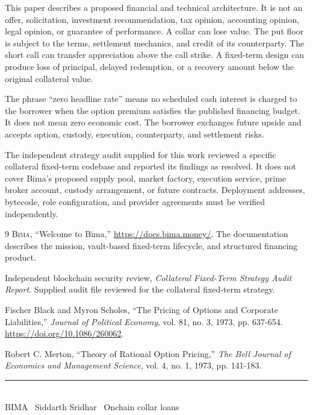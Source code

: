\documentclass[11pt,oneside]{article}
\newcommand{\Bima}{\textsc{Bima}}
\begin{document}
This paper describes a proposed financial and technical architecture. It is not an offer, solicitation, investment recommendation, tax opinion, accounting opinion, legal opinion, or guarantee of performance. A collar can lose value. The put floor is subject to the terms, settlement mechanics, and credit of its counterparty. The short call can transfer appreciation above the call strike. A fixed-term design can produce loss of principal, delayed redemption, or a recovery amount below the original collateral value.

The phrase ``zero headline rate'' means no scheduled cash interest is charged to the borrower when the option premium satisfies the published financing budget. It does not mean zero economic cost. The borrower exchanges future upside and accepts option, custody, execution, counterparty, and settlement risks.

The independent strategy audit supplied for this work reviewed a specific collateral fixed-term codebase and reported its findings as resolved. It does not cover Bima's proposed supply pool, market factory, execution service, prime broker account, custody arrangement, or future contracts. Deployment addresses, bytecode, role configuration, and provider agreements must be verified independently.

\newpage
\begin{thebibliography}{9}
\small
{}
\Bima{}, ``Welcome to Bima,'' \url{https://docs.bima.money/}. The documentation describes the mission, vault-based fixed-term lifecycle, and structured financing product.

Independent blockchain security review, \emph{Collateral Fixed-Term Strategy Audit Report}. Supplied audit file reviewed for the collateral fixed-term strategy.

Fischer Black and Myron Scholes, ``The Pricing of Options and Corporate Liabilities,'' \emph{Journal of Political Economy}, vol. 81, no. 3, 1973, pp. 637-654. \url{https://doi.org/10.1086/260062}.

Robert C. Merton, ``Theory of Rational Option Pricing,'' \emph{The Bell Journal of Economics and Management Science}, vol. 4, no. 1, 1973, pp. 141-183.

\end{thebibliography}

\vfill
\begin{center}
{\color{BimaTeal}\rule{0.22\textwidth}{0.8pt}}\\[0.45em]
 {\color{BimaSlate}\small BIMA \textbar\ Siddarth Sridhar \textbar\ Onchain collar loans}
\end{center}
\end{document}

